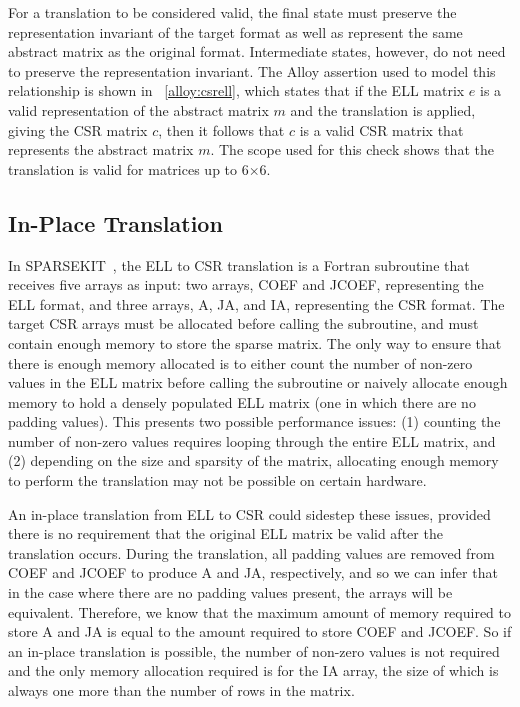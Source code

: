 \documentclass[sigconf]{acmart}
\begin{document}
For a translation to be considered valid, the final state must preserve the representation invariant of the target format as well as represent the same abstract matrix as the original format.  Intermediate states, however, do not need to preserve the representation invariant.  The Alloy assertion used to model this relationship is shown in \figurename~\ref{alloy:csrell}, which states that if the ELL matrix $e$ is a valid representation of the abstract matrix $m$ and the translation is applied, giving the CSR matrix $c$, then it follows that $c$ is a valid CSR matrix that represents the abstract matrix $m$.  The scope used for this check shows that the translation is valid for matrices up to 6$\times$6.

\subsection{In-Place Translation}

In SPARSEKIT~\cite{sparsekit}, the ELL to CSR translation is a Fortran subroutine that receives five arrays as input: two arrays, COEF and JCOEF, representing the ELL format, and three arrays, A, JA, and IA, representing the CSR format.  The target CSR arrays must be allocated before calling the subroutine, and must contain enough memory to store the sparse matrix.  The only way to ensure that there is enough memory allocated is to either count the number of non-zero values in the ELL matrix before calling the subroutine or naively allocate enough memory to hold a densely populated ELL matrix (one in which there are no padding values).  This presents two possible performance issues: (1) counting the number of non-zero values requires looping through the entire ELL matrix, and (2) depending on the size and sparsity of the matrix, allocating enough memory to perform the translation may not be possible on certain hardware.

An in-place translation from ELL to CSR could sidestep these issues, provided there is no requirement that the original ELL matrix be valid after the translation occurs.  
During the translation, all padding values are removed from COEF and JCOEF to produce A and JA, respectively, and so we can infer that in the case where there are no padding values present, the arrays will be equivalent.  Therefore, we know that the maximum amount of memory required to store A and JA is equal to the amount required to store COEF and JCOEF.  So if an in-place translation is possible, the number of non-zero values is not required and the only memory allocation required is for the IA array, the size of which is always one more than the number of rows in the matrix.
\end{document}
